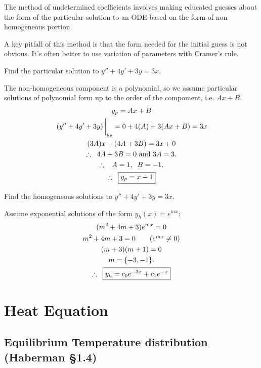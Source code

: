 The method of undetermined coefficients involves making educated guesses about the form of the particular solution to an ODE based on the form of non-homogeneous portion. 

A key pitfall of this method is that the form needed for the initial guess is not obvious. It's often better to use variation of parameters with Cramer's rule. 

\begin{quest}
	\item Find the particular solution to $y'' + 4y' + 3y = 3x$. 
	\begin{ans}
		The non-homogeneous component is a polynomial, so we assume particular solutions of polynomial form up to the order of the compoment, i.e. $Ax + B$.
		\begin{gather*}
			y_p = Ax + B \\
			\eval{\left( y'' + 4y' + 3y \right) }_{y_p} 
				= 0 + 4(A) + 3(Ax+ B) = 3x \\
			(3A)x + (4A + 3B) = 3x + 0 \\
			\therefore \;\; 4A + 3B = 0 \text{ and } 3A = 3.\\
			\therefore \;\;\; A = 1,\;\; B = -1. \\
		\therefore \;\; \boxed{ y_p = x - 1 } 
		\end{gather*}
	\end{ans}
	
	\item Find the homogeneous solutions to $y'' + 4y' + 3y = 3x$. 
	\begin{ans}
		Assume exponential solutions of the form $y_h(x) = e^{mx}$: 
		\begin{gather*}
			(m^2 + 4m + 3) e^{mx} = 0 \\
			m^2 + 4m + 3 = 0 \tag{$e^{mx} \neq 0$}\\
			(m + 3)(m + 1) = 0 \\
			m = \{-3, -1\}. \\ 
			\therefore \;\; \boxed{y_h = c_0 e^{-3x} + c_1 e^{-x}}
		\end{gather*}
	\end{ans}
\end{quest}

\chapter{Heat Equation}

\section{Equilibrium Temperature distribution (Haberman \S 1.4)}

